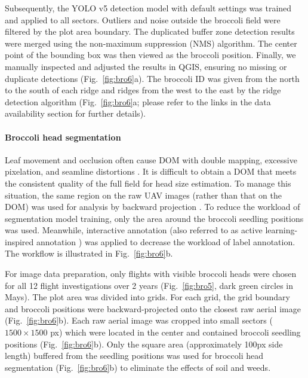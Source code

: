 Subsequently, the YOLO v5 detection model with default settings was trained and applied to all sectors. Outliers and noise outside the broccoli field were filtered by the plot area boundary. The duplicated buffer zone detection results were merged using the non-maximum suppression (NMS) algorithm. The center point of the bounding box was then viewed as the broccoli position. Finally, we manually inspected and adjusted the results in QGIS, ensuring no missing or duplicate detections (Fig.~\ref{fig:bro6}a). The broccoli ID was given from the north to the south of each ridge and ridges from the west to the east by the ridge detection algorithm (Fig.~\ref{fig:bro6}a; please refer to the links in the data availability section for further details). 

\paragraph{Broccoli head segmentation}

Leaf movement and occlusion often cause DOM with double mapping, excessive pixelation, and seamline distortions \citep{lin_new_2021}. It is difficult to obtain a DOM that meets the consistent quality of the full field for head size estimation. To manage this situation, the same region on the raw UAV images (rather than that on the DOM) was used for analysis by backward projection \citep{wang_easyidp_2021}. To reduce the workload of segmentation model training, only the area around the broccoli seedling positions was used. Meanwhile, interactive annotation (also referred to as active learning-inspired annotation \citep{ghosal_weakly_2019}) was applied to decrease the workload of label annotation. The workflow is illustrated in Fig.~\ref{fig:bro6}b.

For image data preparation, only flights with visible broccoli heads were chosen for all 12 flight investigations over 2 years (Fig.~\ref{fig:bro5}, dark green circles in Mays). The plot area was divided into grids. For each grid, the grid boundary and broccoli positions were backward-projected onto the closest raw aerial image (Fig.~\ref{fig:bro6}b). Each raw aerial image was cropped into small sectors ($1500 \times 1500$ px) which were located in the center and contained broccoli seedling positions (Fig.~\ref{fig:bro6}b). Only the square area (approximately 100px side length) buffered from the seedling positions was used for broccoli head segmentation (Fig.~\ref{fig:bro6}b) to eliminate the effects of soil and weeds.

